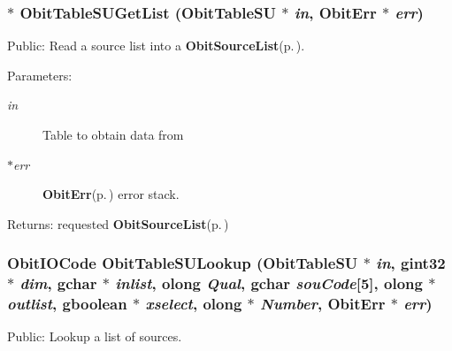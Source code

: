 \subsubsection{$\ast$ Obit\-Table\-SUGet\-List ({\bf Obit\-Table\-SU} $\ast$ {\em in}, {\bf Obit\-Err} $\ast$ {\em err})}\label{ObitTableSUUtil_8c_a1}


Public: Read a source list into a {\bf Obit\-Source\-List}{\rm (p.\,\pageref{structObitSourceList})}. 

\begin{Desc}
\item[Parameters:]
\begin{description}
\item[{\em in}]Table to obtain data from \item[{\em $\ast$err}]{\bf Obit\-Err}{\rm (p.\,\pageref{structObitErr})} error stack. \end{description}
\end{Desc}
\begin{Desc}
\item[Returns:]requested {\bf Obit\-Source\-List}{\rm (p.\,\pageref{structObitSourceList})} \end{Desc}
\subsubsection{\setlength{\rightskip}{0pt plus 5cm}Obit\-IOCode Obit\-Table\-SULookup ({\bf Obit\-Table\-SU} $\ast$ {\em in}, gint32 $\ast$ {\em dim}, gchar $\ast$ {\em inlist}, {\bf olong} {\em Qual}, gchar {\em sou\-Code}[5], {\bf olong} $\ast$ {\em outlist}, gboolean $\ast$ {\em xselect}, {\bf olong} $\ast$ {\em Number}, {\bf Obit\-Err} $\ast$ {\em err})}\label{ObitTableSUUtil_8c_a0}


Public: Lookup a list of sources. 

